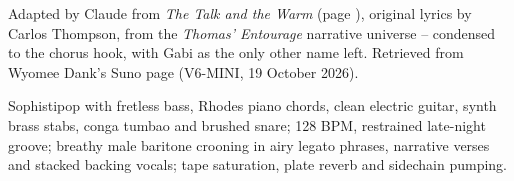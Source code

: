 
\label{sec:i-need-my-aurora}
\begin{notes}
Adapted by Claude from \emph{The Talk and the Warm} (page \pageref{sec:the-talk-and-the-warm}), original lyrics by Carlos Thompson, from the \emph{Thomas' Entourage} narrative universe -- condensed to the chorus hook, with Gabi as the only other name left. Retrieved from Wyomee Dank's Suno page (V6-MINI, 19 October 2026).
\end{notes}
\begin{style}
Sophistipop with fretless bass, Rhodes piano chords, clean electric guitar, synth brass stabs, conga tumbao and brushed snare; 128 BPM, restrained late-night groove; breathy male baritone crooning in airy legato phrases, narrative verses and stacked backing vocals; tape saturation, plate reverb and sidechain pumping.
\end{style}
